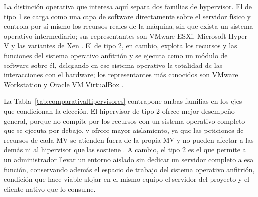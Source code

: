 \documentclass[12pt]{article}
\begin{document}
La distinción operativa que interesa aquí separa dos familias de hypervisor. El de tipo 1 se carga como una capa de software directamente sobre el servidor físico y controla por sí mismo los recursos reales de la máquina, sin que exista un sistema operativo intermediario; sus representantes son VMware ESXi, Microsoft Hyper-V y las variantes de Xen \parencite[\S 14.2, p.\ 633]{stallings2018operating}. El de tipo 2, en cambio, explota los recursos y las funciones del sistema operativo anfitrión y se ejecuta como un módulo de software sobre él, delegando en ese sistema operativo la totalidad de las interacciones con el hardware; los representantes más conocidos son VMware Workstation y Oracle VM VirtualBox \parencite[\S 14.2, p.\ 633]{stallings2018operating}.

La Tabla~\ref{tab:comparativaHipervisores} contrapone ambas familias en los ejes que condicionan la elección. El hipervisor de tipo 2 ofrece mejor desempeño general, porque no compite por los recursos con un sistema operativo completo que se ejecuta por debajo, y ofrece mayor aislamiento, ya que las peticiones de recursos de cada MV se atienden fuera de la propia MV y no pueden afectar a las demás ni al hipervisor que las sostiene \parencite[\S 14.2, p.\ 633]{stallings2018operating}. A cambio, el tipo 2 es el que permite a un administrador llevar un entorno aislado sin dedicar un servidor completo a esa función, conservando además el espacio de trabajo del sistema operativo anfitrión, condición que hace viable alojar en el mismo equipo el servidor del proyecto y el cliente nativo que lo consume.
\end{document}
